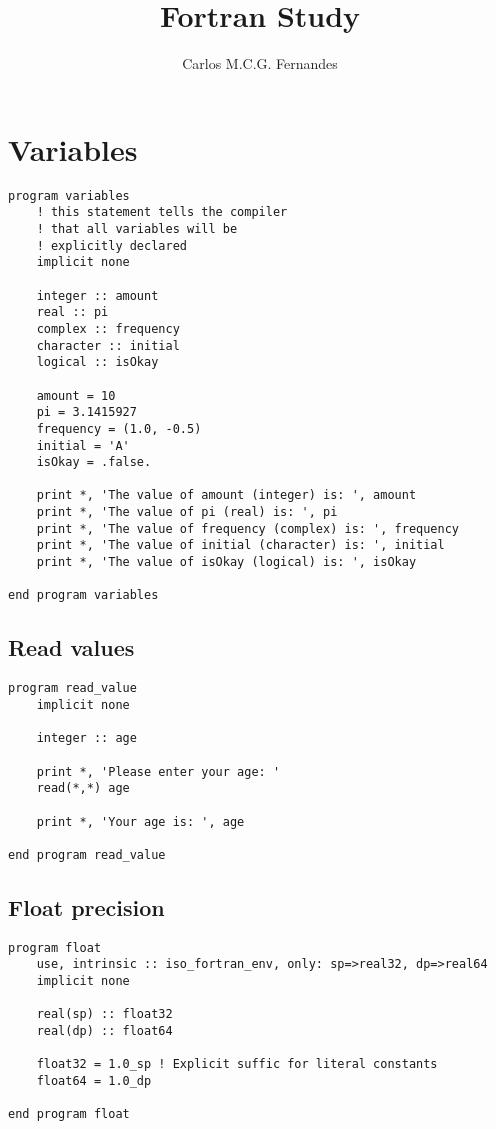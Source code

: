 \documentclass[]{article}
\title{Fortran Study}
\author{Carlos M.C.G. Fernandes}
\begin{document}
\maketitle

\begin{abstract}

\end{abstract}

\section{Variables}

\begin{lstlisting}
program variables
    ! this statement tells the compiler 
    ! that all variables will be 
    ! explicitly declared
    implicit none

    integer :: amount
    real :: pi
    complex :: frequency
    character :: initial
    logical :: isOkay

    amount = 10
    pi = 3.1415927
    frequency = (1.0, -0.5)
    initial = 'A'
    isOkay = .false.

    print *, 'The value of amount (integer) is: ', amount
    print *, 'The value of pi (real) is: ', pi
    print *, 'The value of frequency (complex) is: ', frequency
    print *, 'The value of initial (character) is: ', initial
    print *, 'The value of isOkay (logical) is: ', isOkay

end program variables
\end{lstlisting}

\subsection{Read values}

\begin{lstlisting}
program read_value
    implicit none

    integer :: age

    print *, 'Please enter your age: '
    read(*,*) age

    print *, 'Your age is: ', age

end program read_value
\end{lstlisting}

\subsection{Float precision}

\begin{lstlisting}
program float
    use, intrinsic :: iso_fortran_env, only: sp=>real32, dp=>real64
    implicit none

    real(sp) :: float32
    real(dp) :: float64

    float32 = 1.0_sp ! Explicit suffic for literal constants
    float64 = 1.0_dp

end program float
\end{lstlisting}
\end{document}
